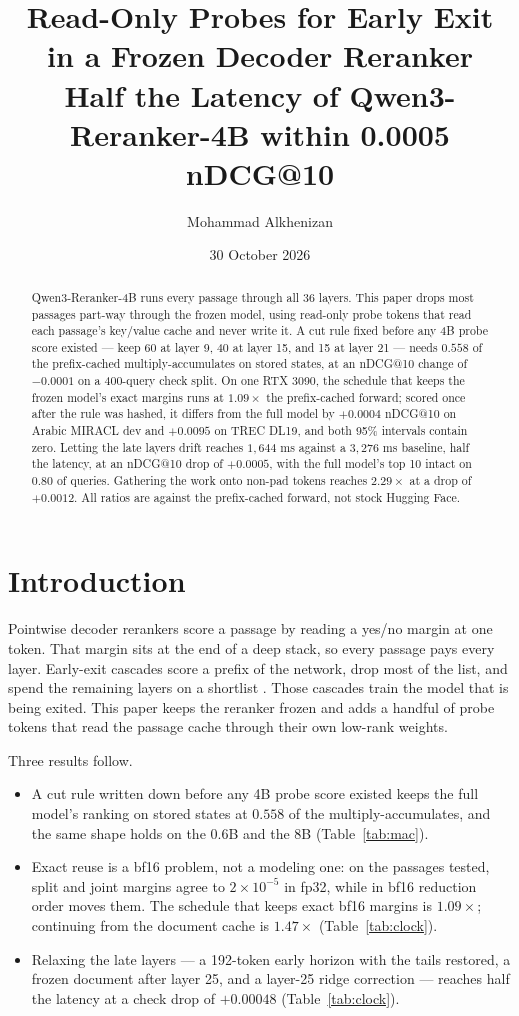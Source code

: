 \documentclass[11pt, a4paper]{article}
\title{Read-Only Probes for Early Exit\\in a Frozen Decoder Reranker\\[0.4em]\large Half the Latency of Qwen3-Reranker-4B within 0.0005 nDCG@10}
\author{Mohammad Alkhenizan}
\date{30 October 2026}
\begin{document}
\maketitle

\begin{abstract}
Qwen3-Reranker-4B runs every passage through all 36 layers.
This paper drops most passages part-way through the frozen model, using read-only probe tokens that read each passage's key/value cache and never write it.
A cut rule fixed before any 4B probe score existed --- keep 60 at layer 9, 40 at layer 15, and 15 at layer 21 --- needs $0.558$ of the prefix-cached multiply-accumulates on stored states, at an nDCG@10 change of $-0.0001$ on a 400-query check split.
On one RTX 3090, the schedule that keeps the frozen model's exact margins runs at $1.09\times$ the prefix-cached forward; scored once after the rule was hashed, it differs from the full model by $+0.0004$ nDCG@10 on Arabic MIRACL dev and $+0.0095$ on TREC DL19, and both 95\% intervals contain zero.
Letting the late layers drift reaches $1{,}644$ ms against a $3{,}276$ ms baseline, half the latency, at an nDCG@10 drop of $+0.0005$, with the full model's top 10 intact on $0.80$ of queries.
Gathering the work onto non-pad tokens reaches $2.29\times$ at a drop of $+0.0012$.
All ratios are against the prefix-cached forward, not stock Hugging Face.
\end{abstract}

\section{Introduction}

Pointwise decoder rerankers score a passage by reading a yes/no margin at one token.
That margin sits at the end of a deep stack, so every passage pays every layer.
Early-exit cascades score a prefix of the network, drop most of the list, and spend the remaining layers on a shortlist \cite{soldaini2020cascade,xin2020early,campagnano2025e2rank}.
Those cascades train the model that is being exited.
This paper keeps the reranker frozen and adds a handful of probe tokens that read the passage cache through their own low-rank weights.

Three results follow.
\begin{itemize}
\item A cut rule written down before any 4B probe score existed keeps the full model's ranking on stored states at $0.558$ of the multiply-accumulates, and the same shape holds on the 0.6B and the 8B (Table~\ref{tab:mac}).
\item Exact reuse is a bf16 problem, not a modeling one: on the passages tested, split and joint margins agree to $2\times 10^{-5}$ in fp32, while in bf16 reduction order moves them. The schedule that keeps exact bf16 margins is $1.09\times$; continuing from the document cache is $1.47\times$ (Table~\ref{tab:clock}).
\item Relaxing the late layers --- a 192-token early horizon with the tails restored, a frozen document after layer 25, and a layer-25 ridge correction --- reaches half the latency at a check drop of $+0.00048$ (Table~\ref{tab:clock}).
\end{itemize}
\end{document}
